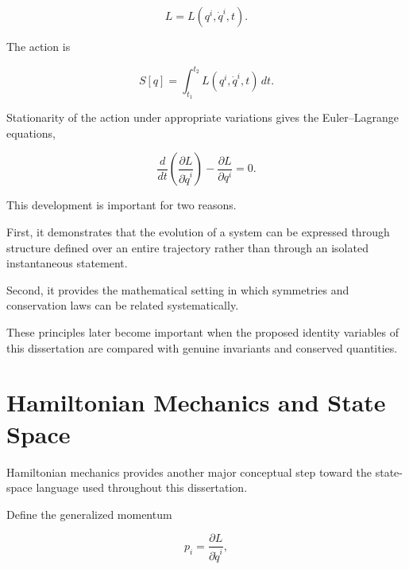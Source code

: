 \documentclass[12pt,oneside]{book}
\begin{document}
\begin{equation}
    L
    =
    L(q^i,\dot{q}^i,t).
    \label{eq:lagrangian-definition}
\end{equation}

The action is

\begin{equation}
    S[q]
    =
    \int_{t_1}^{t_2}
        L(q^i,\dot{q}^i,t)
    \,dt.
    \label{eq:action-definition}
\end{equation}

Stationarity of the action under appropriate variations gives
the Euler--Lagrange equations,

\begin{equation}
    \frac{d}{dt}
    \left(
        \frac{\partial L}
        {\partial \dot{q}^i}
    \right)
    -
    \frac{\partial L}
    {\partial q^i}
    =
    0.
    \label{eq:euler-lagrange}
\end{equation}

This development is important for two reasons.

First, it demonstrates that the evolution of a system can be
expressed through structure defined over an entire trajectory
rather than through an isolated instantaneous statement.

Second, it provides the mathematical setting in which
symmetries and conservation laws can be related systematically.

These principles later become important when the proposed
identity variables of this dissertation are compared with
genuine invariants and conserved quantities.


\section{Hamiltonian Mechanics and State Space}
\label{sec:hamiltonian-state-space}

Hamiltonian mechanics provides another major conceptual step
toward the state-space language used throughout this
dissertation.

Define the generalized momentum

\begin{equation}
    p_i
    =
    \frac{\partial L}
    {\partial \dot{q}^i},
    \label{eq:generalized-momentum}
\end{equation}
\end{document}
